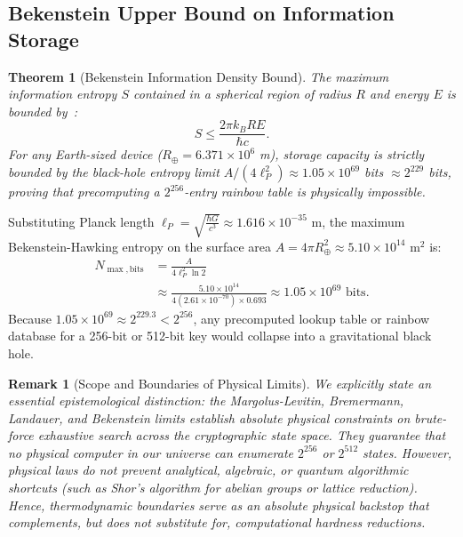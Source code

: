 \documentclass{ieeeaccess}
\newtheorem{theorem}{Theorem}
\newtheorem{remark}{Remark}
\newenvironment{proof}{\begin{IEEEproof}\IEEEQEDoff}{\end{IEEEproof}}
\begin{document}
\subsection{Bekenstein Upper Bound on Information Storage}
\begin{theorem}[Bekenstein Information Density Bound]
\label{thm:L10-bekenstein}
The maximum information entropy $S$ contained in a spherical region of radius $R$ and energy $E$ is bounded by~\cite{Bekenstein1981}:
\begin{equation}
  S \leq \frac{2 \pi k_B R E}{\hbar c}.
\end{equation}
For any Earth-sized device ($R_\oplus = 6.371 \times 10^6$ m), storage capacity is strictly bounded by the black-hole entropy limit $A / (4 \ell_P^2) \approx 1.05 \times 10^{69}$ bits $\approx 2^{229}$ bits, proving that precomputing a $2^{256}$-entry rainbow table is physically impossible.
\end{theorem}
\begin{proof}
Substituting Planck length $\ell_P = \sqrt{\frac{\hbar G}{c^3}} \approx 1.616 \times 10^{-35}$ m, the maximum Bekenstein-Hawking entropy on the surface area $A = 4 \pi R_\oplus^2 \approx 5.10 \times 10^{14}$ m$^2$ is:
\begin{equation}
\begin{aligned}
  N_{\max,\text{bits}} &= \frac{A}{4 \ell_P^2 \ln 2} \\
  &\approx \frac{5.10 \times 10^{14}}{4 (2.61 \times 10^{-70}) \times 0.693} \approx 1.05 \times 10^{69} \text{ bits}.
\end{aligned}
\end{equation}
Because $1.05 \times 10^{69} \approx 2^{229.3} < 2^{256}$, any precomputed lookup table or rainbow database for a 256-bit or 512-bit key would collapse into a gravitational black hole.
\end{proof}

\begin{remark}[Scope and Boundaries of Physical Limits]
We explicitly state an essential epistemological distinction: the Margolus-Levitin, Bremermann, Landauer, and Bekenstein limits establish absolute physical constraints on \emph{brute-force exhaustive search} across the cryptographic state space. They guarantee that no physical computer in our universe can enumerate $2^{256}$ or $2^{512}$ states. However, physical laws do not prevent analytical, algebraic, or quantum algorithmic shortcuts (such as Shor's algorithm for abelian groups or lattice reduction). Hence, thermodynamic boundaries serve as an absolute physical backstop that complements, but does not substitute for, computational hardness reductions.
\end{remark}
\end{document}
